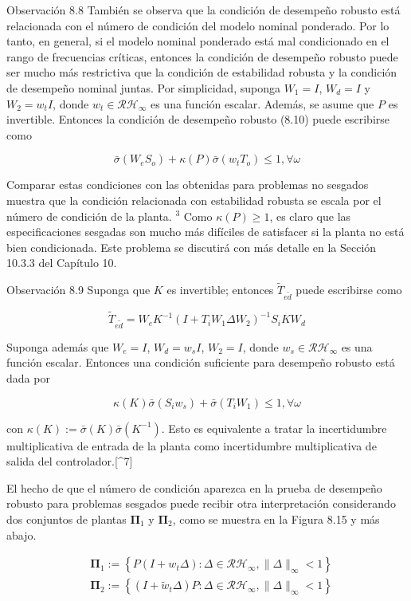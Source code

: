 Observación 8.8 También se observa que la condición de desempeño robusto está relacionada con el número de condición del modelo nominal ponderado. Por lo tanto, en general, si el modelo nominal ponderado está mal condicionado en el rango de frecuencias críticas, entonces la condición de desempeño robusto puede ser mucho más restrictiva que la condición de estabilidad robusta y la condición de desempeño nominal juntas. Por simplicidad, suponga $W_{1}=I$, $W_{d}=I$ y $W_{2}=w_{t} I$, donde $w_{t} \in \mathcal{R} \mathcal{H}_{\infty}$ es una función escalar. Además, se asume que $P$ es invertible. Entonces la condición de desempeño robusto (8.10) puede escribirse como

$$
\bar{\sigma}\left(W_{e} S_{o}\right)+\kappa(P) \bar{\sigma}\left(w_{t} T_{o}\right) \leq 1, \forall \omega
$$

Comparar estas condiciones con las obtenidas para problemas no sesgados muestra que la condición relacionada con estabilidad robusta se escala por el número de condición de la planta. ${ }^{3}$ Como $\kappa(P) \geq 1$, es claro que las especificaciones sesgadas son mucho más difíciles de satisfacer si la planta no está bien condicionada. Este problema se discutirá con más detalle en la Sección 10.3.3 del Capítulo 10.

Observación 8.9 Suponga que $K$ es invertible; entonces $\tilde{T}_{e \tilde{d}}$ puede escribirse como

$$
\tilde{T}_{e \tilde{d}}=W_{e} K^{-1}\left(I+T_{i} W_{1} \Delta W_{2}\right)^{-1} S_{i} K W_{d}
$$

Suponga además que $W_{e}=I$, $W_{d}=w_{s} I$, $W_{2}=I$, donde $w_{s} \in \mathcal{R} \mathcal{H}_{\infty}$ es una función escalar. Entonces una condición suficiente para desempeño robusto está dada por

$$
\kappa(K) \bar{\sigma}\left(S_{i} w_{s}\right)+\bar{\sigma}\left(T_{i} W_{1}\right) \leq 1, \forall \omega
$$

con $\kappa(K):=\bar{\sigma}(K) \bar{\sigma}\left(K^{-1}\right)$. Esto es equivalente a tratar la incertidumbre multiplicativa de entrada de la planta como incertidumbre multiplicativa de salida del controlador.[\^{}7]

El hecho de que el número de condición aparezca en la prueba de desempeño robusto para problemas sesgados puede recibir otra interpretación considerando dos conjuntos de plantas $\boldsymbol{\Pi}_{1}$ y $\boldsymbol{\Pi}_{2}$, como se muestra en la Figura 8.15 y más abajo.

$$
\begin{aligned}
& \boldsymbol{\Pi}_{1}:=\left\{P\left(I+w_{t} \Delta\right): \Delta \in \mathcal{R} \mathcal{H}_{\infty},\|\Delta\|_{\infty}<1\right\} \\
& \boldsymbol{\Pi}_{2}:=\left\{\left(I+\tilde{w}_{t} \Delta\right) P: \Delta \in \mathcal{R} \mathcal{H}_{\infty},\|\Delta\|_{\infty}<1\right\}
\end{aligned}
$$

